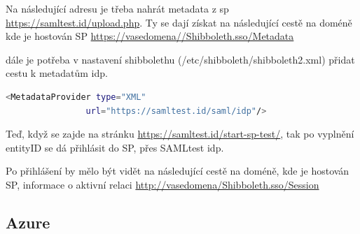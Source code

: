 Na následující adresu je třeba nahrát metadata z sp 
\url{https://samltest.id/upload.php}. Ty se dají získat na následující cestě na doméně kde je hostován SP \url{https://vasedomena//Shibboleth.sso/Metadata}

dále je potřeba v nastavení shibbolethu (/etc/shibboleth/shibboleth2.xml) přidat cestu k metadatům idp.
\begin{lstlisting}[language=Bash]
 <MetadataProvider type="XML"
                url="https://samltest.id/saml/idp"/>
\end{lstlisting}

Teď, když se zajde na stránku \url{https://samltest.id/start-sp-test/}, tak po vyplnění entityID se dá přihlásit do SP, přes SAMLtest idp.

Po přihlášení by mělo být vidět na následující cestě na doméně, kde je hostován SP, informace o aktivní relaci \url{http://vasedomena/Shibboleth.sso/Session} 



\subsection{Azure}

